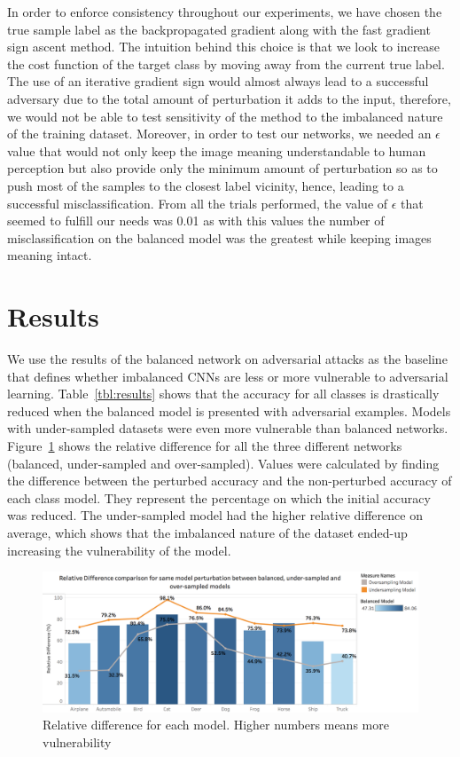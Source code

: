 \documentclass[runningheads,a4paper]{llncs}
\begin{document}
In order to enforce consistency throughout our experiments, we have chosen the true sample label as the backpropagated gradient along with the fast gradient sign ascent method. The intuition behind this choice is that we look to increase the cost function of the target class by moving away from the current true label. The use of an iterative gradient sign would almost always lead to a successful adversary due to the total amount of perturbation it adds to the input, therefore, we would not be able to test sensitivity of the method to the imbalanced nature of the training dataset. Moreover, in order to test our networks, we needed an $\epsilon$ value that would not only keep the image meaning understandable to human perception but also provide only the minimum amount of perturbation so as to push most of the samples to the closest label vicinity, hence, leading to a successful misclassification. From all the trials performed, the value of $\epsilon$ that seemed to fulfill our needs was 0.01 as with this values the number of misclassification on the balanced model was the greatest while keeping images meaning intact.


\section{Results}
We use the results of the balanced network on adversarial attacks as the baseline that defines whether imbalanced CNNs are less or more vulnerable to adversarial learning. Table~\ref{tbl:results} shows that the accuracy for all classes is drastically reduced when the balanced model is presented with adversarial examples. Models with under-sampled datasets were even more vulnerable than balanced networks. Figure~\ref{fig:relative_difference} shows the relative difference for all the three different networks (balanced, under-sampled and over-sampled). Values were calculated by finding the difference between the perturbed accuracy and the non-perturbed accuracy of each class model. They represent the percentage on which the initial accuracy was reduced. The under-sampled model had the higher relative difference on average, which shows that the imbalanced nature of the dataset ended-up increasing the vulnerability of the model.

\begin{figure}
	\centering
	\includegraphics[height=4.2cm]{rel_diff_graph.png}
	\caption{Relative difference for each model. Higher numbers means more vulnerability}
	\label{fig:relative_difference}
\end{figure}
\end{document}

